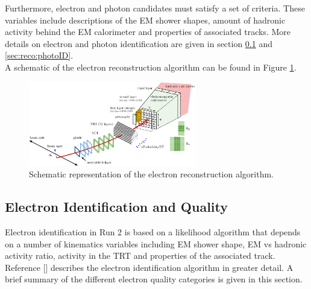 \indent Furthermore, electron and photon candidates must satisfy a set of criteria.  These variables include descriptions of the EM shower shapes, amount of hadronic activity behind the EM calorimeter and properties of associated tracks.  More details on electron and photon identification are given in section \ref{sec:reco:eleQuality} and \ref{sec:reco:photoID}. \\

\indent A schematic of the electron reconstruction algorithm can be found in Figure \ref{fig:elec_rec}. \\

\begin{figure}[!h] 
\begin{center}
\includegraphics[width=0.65\textwidth]{figures/EMCalib/Reco_Diag.png}
\caption[Schematic representation of the electron reconstruction algorithm]{Schematic representation of the electron reconstruction algorithm.\cite{EleID} }
\label{fig:elec_rec}
\end{center}
\end{figure}

\subsection{Electron Identification and Quality}
\label{sec:reco:eleQuality}

\indent Electron identification in Run 2 is based on a likelihood algorithm that depends on a number of kinematics variables including EM shower shape, EM vs hadronic activity ratio, activity in the TRT and properties of the associated track.  Reference [\cite{EleID}] describes the electron identification algorithm in greater detail.  A brief summary of the different electron quality categories is given in this section.  \\%

